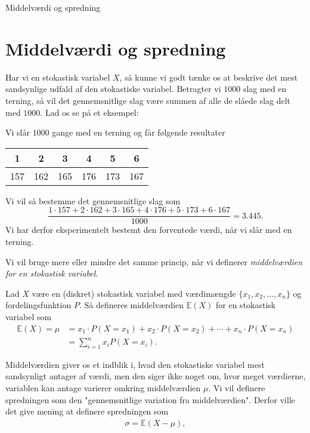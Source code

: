 \begin{center}
\Huge
Middelværdi og spredning
\end{center}
\section*{Middelværdi og spredning}

Har vi en stokastisk variabel $X$, så kunne vi godt tænke os at beskrive det mest sandsynlige udfald af den stokastiske variabel. Betragter vi $1000$ slag med en terning, så vil det gennemsnitlige slag være summen af alle de slåede slag delt med $1000$. Lad os se på et eksempel:
\begin{exa}
Vi slår $1000$ gange med en terning og får følgende resultater
\begin{center}
\begin{tabular}{c|c|c|c|c|c}
1 & 2 & 3 & 4 & 5 & 6 \\
\hline 
157& 162& 165& 176& 173& 167
\end{tabular}
\end{center}
Vi vil så bestemme det gennemsnitlige slag som
\[
\frac{1\cdot 157 + 2\cdot 162 + 3\cdot 165 + 4 \cdot 176 + 5\cdot 173 + 6\cdot 167}{1000} = 3.445.
\]
Vi har derfor eksperimentelt bestemt den forventede værdi, når vi slår med en terning. 
\end{exa}
Vi vil bruge mere eller mindre det samme princip, når vi definerer \textit{middelværdien for en stokastisk variabel}.
\begin{defn}[Middelværdi]
Lad $X$ være en (diskret) stokastisk variabel med værdimængde $\{x_1,x_2,\hdots,x_n\}$ og fordelingsfunktion $P$. Så defineres middelværdien $\mathbb{E}(X)$ for en stokastisk variabel som
\begin{align*}
\mathbb{E}(X) = \mu &= x_1 \cdot P(X = x_1) + x_2 \cdot P(X=x_2) + \cdots + x_n \cdot P(X=x_n)\\
&= \sum_{i=1}^{n} x_i P(X=x_i).
\end{align*} 
\end{defn}
Middelværdien giver os et indblik i, hvad den stokastiske variabel mest sandsynligt antager af værdi, men den siger ikke noget om, hvor meget værdierne, variablen kan antage varierer omkring middelværdien $\mu$. Vi vil definere spredningen som den "gennemsnitlige variation fra middelværdien". Derfor ville det give mening at definere spredningen som 
\begin{align*}
\sigma = \mathbb{E}(X-\mu), 
\end{align*}
